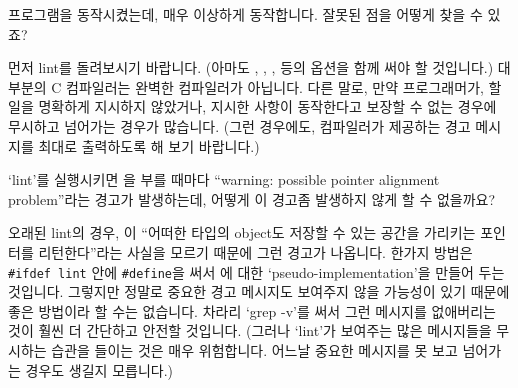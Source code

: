 \begin{faq}
	프로그램을 동작시켰는데, 매우 이상하게 동작합니다.
	잘못된 점을 어떻게 찾을 수 있죠?

\A
	먼저 lint를 돌려보시기 바랍니다.  (아마도 , , ,
	 등의 옵션을 함께 써야 할 것입니다.)
        대부분의 C 컴파일러는 완벽한 컴파일러가 아닙니다. 다른 말로,
        만약 프로그래머가, 할 일을 명확하게 지시하지 않았거나, 지시한 사항이
        동작한다고 보장할 수 없는 경우에 무시하고 넘어가는 경우가 많습니다.
        (그런 경우에도, 컴파일러가 제공하는 경고 메시지를 최대로 출력하도록
        해 보기 바랍니다.)


\R
	\cite{lint}
\end{faq}

\begin{faq}
	`lint'를 실행시키면 을 부를 때마다 ``warning: possible 
	pointer alignment problem''라는 경고가 발생하는데, 어떻게 이 경고좀
	발생하지 않게 할 수 없을까요?

\A
	오래된 lint의 경우, 이 ``어떠한 타입의 object도 저장할
	수 있는 공간을 가리키는 포인터를 리턴한다''라는 사실을 모르기
	때문에 그런 경고가 나옵니다.
	한가지 방법은 \verb+#ifdef lint+ 안에 \verb+#define+을 써서
	에 대한 `pseudo-implementation'을 만들어 두는 것입니다.
	그렇지만 정말로 중요한 경고 메시지도 보여주지 않을 가능성이 있기 때문에
	좋은 방법이라 할 수는 없습니다.  차라리 `grep -v'를 써서 그런 메시지를
	없애버리는 것이 훨씬 더 간단하고 안전할 것입니다.
	(그러나 `lint'가 보여주는 많은 메시지들을 무시하는 습관을 들이는 것은
	매우 위험합니다.  어느날 중요한 메시지를 못 보고 넘어가는 경우도
	생길지 모릅니다.)
\end{faq}


